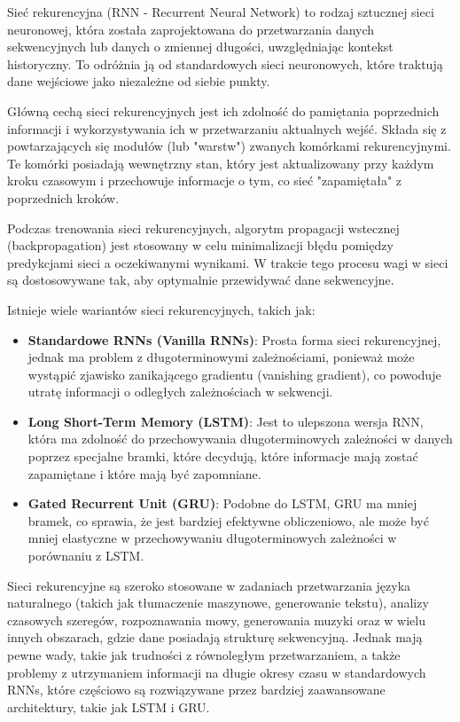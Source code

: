 \documentclass{article}
\begin{document}
Sieć rekurencyjna (RNN - Recurrent Neural Network) to rodzaj sztucznej sieci neuronowej, która została zaprojektowana do przetwarzania danych sekwencyjnych lub danych o zmiennej długości, uwzględniając kontekst historyczny. To odróżnia ją od standardowych sieci neuronowych, które traktują dane wejściowe jako niezależne od siebie punkty.

Główną cechą sieci rekurencyjnych jest ich zdolność do pamiętania poprzednich informacji i wykorzystywania ich w przetwarzaniu aktualnych wejść. Składa się z powtarzających się modułów (lub "warstw") zwanych komórkami rekurencyjnymi. Te komórki posiadają wewnętrzny stan, który jest aktualizowany przy każdym kroku czasowym i przechowuje informacje o tym, co sieć "zapamiętała" z poprzednich kroków.

Podczas trenowania sieci rekurencyjnych, algorytm propagacji wstecznej (backpropagation) jest stosowany w celu minimalizacji błędu pomiędzy predykcjami sieci a oczekiwanymi wynikami. W trakcie tego procesu wagi w sieci są dostosowywane tak, aby optymalnie przewidywać dane sekwencyjne.

Istnieje wiele wariantów sieci rekurencyjnych, takich jak:
\begin{itemize}
    \item \textbf{Standardowe RNNs (Vanilla RNNs)}: Prosta forma sieci rekurencyjnej, jednak ma problem z długoterminowymi zależnościami, ponieważ może wystąpić zjawisko zanikającego gradientu (vanishing gradient), co powoduje utratę informacji o odległych zależnościach w sekwencji.
    \item \textbf{Long Short-Term Memory (LSTM)}: Jest to ulepszona wersja RNN, która ma zdolność do przechowywania długoterminowych zależności w danych poprzez specjalne bramki, które decydują, które informacje mają zostać zapamiętane i które mają być zapomniane.
    \item \textbf{Gated Recurrent Unit (GRU)}: Podobne do LSTM, GRU ma mniej bramek, co sprawia, że jest bardziej efektywne obliczeniowo, ale może być mniej elastyczne w przechowywaniu długoterminowych zależności w porównaniu z LSTM.
\end{itemize}

Sieci rekurencyjne są szeroko stosowane w zadaniach przetwarzania języka naturalnego (takich jak tłumaczenie maszynowe, generowanie tekstu), analizy czasowych szeregów, rozpoznawania mowy, generowania muzyki oraz w wielu innych obszarach, gdzie dane posiadają strukturę sekwencyjną. Jednak mają pewne wady, takie jak trudności z równoległym przetwarzaniem, a także problemy z utrzymaniem informacji na długie okresy czasu w standardowych RNNs, które częściowo są rozwiązywane przez bardziej zaawansowane architektury, takie jak LSTM i GRU.
\end{document}
